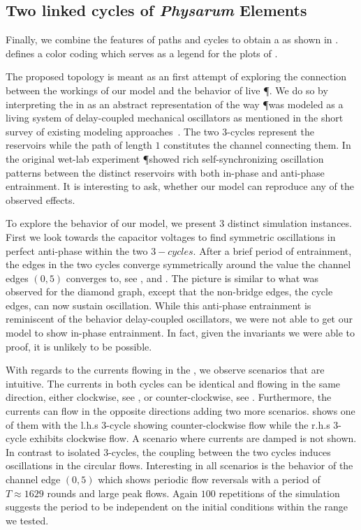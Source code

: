 	\subsection{Two linked cycles of \emph{Physarum} Elements}

		Finally, we combine the features of paths and cycles to obtain a \Pns as shown in .  defines a color coding which serves as a legend for the plots of .

		The proposed topology is meant as an first attempt of exploring the connection between the workings of our model and the behavior of live \P. We do so by interpreting the \Pn in  as an abstract representation of the way \P was modeled as a living system of delay-coupled mechanical oscillators as mentioned in the short survey of existing modeling approaches~\cite{PhysRevLett.85.2026}. The two $3$-cycles represent the reservoirs while the path of length $1$ constitutes the channel connecting them. In the original wet-lab experiment \P showed rich self-synchronizing oscillation patterns between the distinct reservoirs with both in-phase and anti-phase entrainment. It is interesting to ask, whether our model can reproduce any of the observed effects.

		To explore the behavior of our model, we present $3$ distinct simulation instances. First we look towards the capacitor voltages to find symmetric oscillations in perfect anti-phase within the two $3-cycles$. After a brief period of entrainment, the edges in the two cycles converge symmetrically around the value the channel edges $(0,5)$ converges to, see ,  and . The picture is similar to what was observed for the diamond graph, except that the non-bridge edges, \ie the cycle edges, can now sustain oscillation. While this anti-phase entrainment is reminiscent of the behavior delay-coupled oscillators, we were not able to get our model to show in-phase entrainment. In fact, given the invariants we were able to proof, it is unlikely to be possible.

		With regards to the currents flowing in the \Pn, we observe scenarios that are intuitive. The currents in both cycles can be identical and flowing in the same direction, either clockwise, see , or counter-clockwise, see . Furthermore, the currents can flow in the opposite directions adding two more scenarios.  shows one of them with the l.h.s $3$-cycle showing counter-clockwise flow while the r.h.s $3$-cycle exhibits clockwise flow. A scenario where currents are damped is not shown. In contrast to isolated $3$-cycles, the coupling between the two cycles induces oscillations in the circular flows.	Interesting in all scenarios is the behavior of the channel edge $(0,5)$ which shows periodic flow reversals with a period of $T \approx 1629 $ rounds and large peak flows. Again $100$ repetitions of the simulation suggests the period to be independent on the initial conditions within the range we tested.

